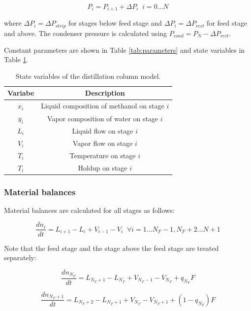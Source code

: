 \begin{equation}
    P_i = P_{i+1} + \Delta P_i \;\; i=0\dots N
\end{equation}

where $\Delta P_i =\Delta P_{strip}$ for stages below feed stage and $\Delta P_i =\Delta P_{rect}$ for feed stage and above. The condenser pressure is calculated using $P_{cond}=P_{N} - \Delta P_{rect}$.

Constant parameters are shown in Table \ref{tab:parameters} and state variables in Table \ref{tab:state_variables}.
\begin{table}
    \centering
    \caption{State variables of the distillation column model.}
    \begin{tabular}{cc}
        \textbf{Variabe} & \textbf{Description}  \\
        \hline
         $x_i$ &  Liquid composition of methanol on stage $i$ \\
         $y_i$ & Vapor composition of water on stage $i$\\
         $L_i$ & Liquid flow on stage $i$  \\
         $V_i$  & Vapor flow on stage $i$ \\
         $T_i$  & Temperature on stage $i$ \\
         $T_i$  & Holdup on stage $i$ \\
         \hline
    \end{tabular}
    \label{tab:state_variables}
\end{table}

\subsubsection{Material balances}
Material balances are calculated for all stages as follows:

\begin{equation}
\frac{dn_i}{dt} = L_{i+1}-L_i + V_{i-1}-V_i \;\; \forall i=1 \dots N_F-1, N_F+2 \dots N+1
\end{equation}

Note that the feed stage and the stage above the feed stage are treated separately:

\begin{equation}
    \frac{dn_{N_F}}{dt} = L_{N_F+1}-L_{N_F} + V_{N_F-1}-V_{N_F} + q_{N_F}F   
\end{equation}

\begin{equation}
   \frac{dn_{N_F+1}}{dt} = L_{N_F+2}-L_{N_F+1} + V_{N_F}-V_{N_F+1} + (1-q_{N_F})F 
\end{equation}

